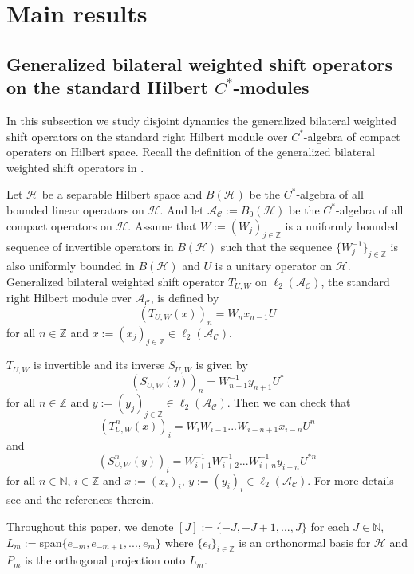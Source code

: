 \documentclass{article}
\begin{document}
\section{Main results}
\subsection{Generalized bilateral weighted shift operators on the standard Hilbert $C^{\ast}$-modules}
In this subsection we study disjoint dynamics the generalized bilateral weighted shift operators on the standard right Hilbert module over  $C^{\ast}$-algebra of compact operaters on Hilbert space. Recall the definition of the generalized bilateral weighted shift operators in \cite{I24}.

Let $\mathcal{H}$ be a separable Hilbert space and $B(\mathcal{H})$ be the $C^{\ast}$-algebra of all bounded linear operators on $\mathcal{H}$. And let $\mathcal{A_{C}}:=B_{0}(\mathcal{H})$ be the $C^{\ast}$-algebra of all compact operators on $\mathcal{H}$. Assume that $W:=(W_{j})_{j\in\mathbb{Z}}$ is a uniformly bounded sequence of invertible operators in $B(\mathcal{H})$ such that the sequence $\{W^{-1}_{j}\}_{j\in\mathbb{Z}}$ is also uniformly bounded in $B(\mathcal{H})$ and $U$ is a unitary operator on $\mathcal{H}$. Generalized bilateral weighted shift operator $T_{U, W}$ on $\ell_{2}(\mathcal{A_{C}})$, the standard right Hilbert module over $\mathcal{A_{C}}$, is defined by
\[(T_{U,W}(x))_{n}=W_{n}x_{n-1}U\]
for all $n\in\mathbb{Z}$ and $x:=(x_{j})_{j\in\mathbb{Z}}\in\ell_{2}(\mathcal{A_{C}})$.

$T_{U,W}$ is invertible and its inverse $S_{U,W}$ is given by
\[(S_{U,W}(y))_{n}=W^{-1}_{n+1}y_{n+1}U^{\ast}\]
for all $n\in\mathbb{Z}$ and $y:=(y_{j})_{j\in\mathbb{Z}}\in\ell_{2}(\mathcal{A_{C}})$.
Then we can check that
\[(T^{n}_{U,W}(x))_{i}=W_{i}W_{i-1}...W_{i-n+1}x_{i-n}U^{n}\]
and
\[(S^{n}_{U,W}(y))_{i}=W^{-1}_{i+1}W^{-1}_{i+2}...W^{-1}_{i+n}y_{i+n}U^{\ast n}\]
for all $n\in\mathbb{N}$, $i\in\mathbb{Z}$ and $x:=(x_{i})_{i}$, $y:=(y_{i})_{i}\in \ell_{2}(\mathcal{A_{C}})$. For more details see \cite{I24} and the references therein.

Throughout this paper, we denote $[J]:=\{-J, -J+1,..., J\}$ for each $J\in\mathbb{N}$, $L_{m}:=\textrm{span}\{e_{-m}, e_{-m+1},..., e_{m}\}$ where $\{e_{i}\}_{i\in\mathbb{Z}}$ is an orthonormal basis for $\mathcal{H}$ and $P_{m}$ is the orthogonal projection onto $L_{m}$.
\end{document}
